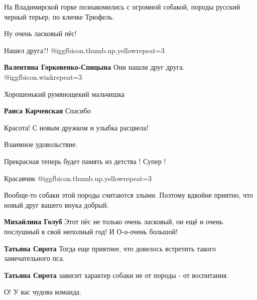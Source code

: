  
 
 
 
 


На Владимирской горке познакомились с огромной собакой, породы русский черный
терьер, по кличке Трюфель.

Ну очень ласковый пёс!

Нашел друга?! @igg{fbicon.thumb.up.yellow}{repeat=3} 

\textbf{Валентина Горковенко-Спицына} Они нашли друг друга. @igg{fbicon.wink}{repeat=3} 

Хорошенький румянощекий мальчишка

\textbf{Раиса Карчевская} Спасибо

Красота! С новым дружком и улыбка расцвела!

Взаимное удовольствие.

Прекрасная теперь будет память из детства ! Супер !

Красавчик @igg{fbicon.thumb.up.yellow}{repeat=3} 

Вообще-то собаки этой породы считаются злыми. Поэтому вдвойне приятно, что новый друг вашего внука добрый.

\textbf{Михайлина Голуб} Этот пёс не только очень ласковый, он ещё и очень послушный в свой неполный год! И О-о-очень большой!

\textbf{Татьяна Сирота} Тогда еще приятнее, что довелось встретить такого замечательного пса.

\textbf{Татьяна Сирота} зависит характер собаки не от породы - от воспитания.

О! У вас чудова команда.
